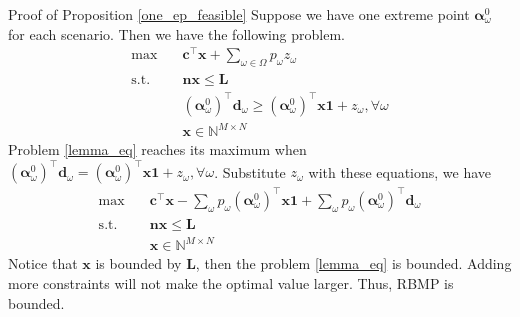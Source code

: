   \begin{pf}{Proof of Proposition \ref{one_ep_feasible}}
    Suppose we have one extreme point $\bm{\alpha}_{\omega}^{0}$ for each scenario. Then we have the following problem.
    \begin{equation}\label{lemma_eq}
      \begin{aligned}
        \max \quad & \mathbf{c}^{\intercal} \mathbf{x} + \sum_{\omega \in \Omega} p_{\omega} z_{\omega} \\
        \text {s.t.} \quad & \mathbf{n} \mathbf{x} \leq \mathbf{L} \\
        & (\bm{\alpha}_{\omega}^{0})^{\intercal}\mathbf{d}_{\omega} \geq (\bm{\alpha}_{\omega}^{0})^{\intercal} \mathbf{x} \mathbf{1} + z_{\omega}, \forall \omega \\
         & \mathbf{x} \in \mathbb{N}^{M \times N}
      \end{aligned}
    \end{equation}
    Problem \eqref{lemma_eq} reaches its maximum when $(\bm{\alpha}_{\omega}^{0})^{\intercal}\mathbf{d}_{\omega} = (\bm{\alpha}_{\omega}^{0})^{\intercal} \mathbf{x} \mathbf{1} + z_{\omega}, \forall \omega$. Substitute $z_{\omega}$ with these equations, we have 
    \begin{equation}\label{lemma_eq2}
      \begin{aligned}
        \max \quad & \mathbf{c}^{\intercal} \mathbf{x} - \sum_{\omega}p_{\omega}(\bm{\alpha}_{\omega}^{0})^{\intercal} \mathbf{x} \mathbf{1} + \sum_{\omega} p_{\omega} (\bm{\alpha}_{\omega}^{0})^{\intercal} \mathbf{d}_{\omega} \\
        \text {s.t.} \quad & \mathbf{n} \mathbf{x} \leq \mathbf{L} \\
        & \mathbf{x} \in \mathbb{N}^{M \times N}
      \end{aligned}
    \end{equation}
    Notice that $\mathbf{x}$ is bounded by $\mathbf{L}$, then the problem \eqref{lemma_eq} is bounded. Adding more constraints will not make the optimal value larger. Thus, RBMP is bounded. 
  \end{pf}


